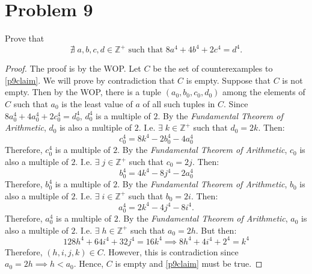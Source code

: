 \documentclass{article}
\begin{document}
\pagebreak

\section{Problem 9}
Prove that
\begin{equation}\label{p9claim}
	\nexists \; a, b, c, d \in \mathbb{Z^+} \text{ such that } 8a^4 + 4b^4 + 2c^4 = d^4.
\end{equation}

\begin{proof}
	The proof is by the WOP. Let $C$ be the set of counterexamples to \eqref{p9claim}. We will prove by contradiction that $C$ is empty. Suppose that $C$ is not empty. Then by the WOP, there is a tuple $(a_0, b_0, c_0, d_0)$ among the elements of $C$ such that $a_0$ is the least value of $a$ of all such tuples in $C$. Since $8a_0^4 + 4a_0^4 + 2c_0^4 = d_0^4$, $d_0^4$ is a multiple of $2$. By the \textit{Fundamental Theorem of Arithmetic}, $d_0$ is also a multiple of $2$. I.e. $\exists \; k \in \mathbb{Z^+}$ such that $d_0 = 2k$. Then:
	\[
		c_0^4 = 8k^4 - 2b_0^4 - 4a_0^4
	\]
	Therefore, $c_0^4$ is a multiple of $2$. By the \textit{Fundamental Theorem of Arithmetic}, $c_0$ is also a multiple of $2$. I.e. $\exists \; j \in \mathbb{Z^+}$ such that $c_0 = 2j$. Then:
	\[
		b_0^4 = 4k^4 - 8j^4 - 2a_0^4
	\]
	Therefore, $b_0^4$ is a multiple of $2$. By the \textit{Fundamental Theorem of Arithmetic}, $b_0$ is also a multiple of $2$. I.e. $\exists \; i \in \mathbb{Z^+}$ such that $b_0 = 2i$. Then:
	\[
		a_0^4 = 2k^4 - 4j^4 - 8i^4.
	\]
	Therefore, $a_0^4$ is a multiple of $2$. By the \textit{Fundamental Theorem of Arithmetic}, $a_0$ is also a multiple of $2$. I.e. $\exists \; h \in \mathbb{Z^+}$ such that $a_0 = 2h$. But then:
	\[
		128h^4 + 64i^4 + 32j^4 = 16k^4 \implies 8h^4 + 4i^4 + 2^4 = k^4
	\]
	Therefore, $(h, i, j, k) \in C$. However, this is contradiction since $a_0 = 2h \implies h < a_0$. Hence, $C$ is empty and \eqref{p9claim} must be true.

\end{proof}

\pagebreak
\end{document}
